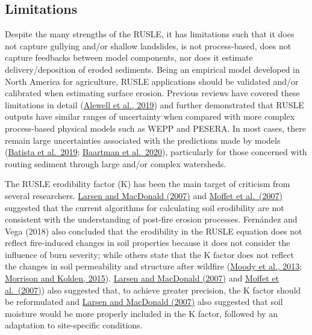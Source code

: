 \documentclass[
]{article}
\begin{document}
\hypertarget{limitations}{%
\subsection*{Limitations}\label{limitations}}

Despite the many strengths of the RUSLE, it has limitations such that it does not capture gullying and/or shallow landslides, is not process-based, does not capture feedbacks between model components, nor does it estimate delivery/deposition of eroded sediments. Being an empirical model developed in North America for agriculture, RUSLE applications should be validated and/or calibrated when estimating surface erosion. Previous reviews have covered these limitations in detail (\href{https://www.sciencedirect.com/science/article/pii/S2095633919300048}{Alewell et al., 2019}) and further demonstrated that RUSLE outputs have similar ranges of uncertainty when compared with more complex process-based physical models such as WEPP and PESERA. In most cases, there remain large uncertainties associated with the predictions made by models (\href{https://www.researchgate.net/publication/334496630_On_the_evaluation_of_soil_erosion_models_Are_we_doing_enough}{Batista et al.~2019}; \href{https://www.sciencedirect.com/science/article/pii/S0169555X20302725}{Baartman et al.~2020}), particularly for those concerned with routing sediment through large and/or complex watersheds.

The RUSLE erodibility factor (K) has been the main target of criticism from several researchers. \href{https://acsess.onlinelibrary.wiley.com/doi/abs/10.2136/sssaj2007.0432}{Larsen and MacDonald (2007)} and \href{https://www.researchgate.net/publication/222540666_Modeling_soil_erosion_on_steep_sagebrush_rangeland_before_and_after_prescribed_fire}{Moffet et al.~(2007)} suggested that the current algorithms for calculating soil erodibility are not consistent with the understanding of post-fire erosion processes. Fernández and Vega (2018) also concluded that the erodibility in the RUSLE equation does not reflect fire-induced changes in soil properties because it does not consider the influence of burn severity; while others state that the K factor does not reflect the changes in soil permeability and structure after wildfire (\href{https://onlinelibrary.wiley.com/doi/10.1002/hyp.13543}{Moody et al., 2013}; \href{https://www.researchgate.net/publication/270163637_Modeling_the_impacts_of_wildfire_on_runoff_and_pollutant_transport_from_coastal_watersheds_to_the_nearshore_environment}{Morrison and Kolden, 2015}). \href{https://acsess.onlinelibrary.wiley.com/doi/abs/10.2136/sssaj2007.0432}{Larsen and MacDonald (2007)} and \href{https://www.researchgate.net/publication/222540666_Modeling_soil_erosion_on_steep_sagebrush_rangeland_before_and_after_prescribed_fire}{Moffet et al.~(2007)}) also suggested that, to achieve greater precision, the K factor should be reformulated and \href{https://acsess.onlinelibrary.wiley.com/doi/abs/10.2136/sssaj2007.0432}{Larsen and MacDonald (2007)} also suggested that soil moisture would be more properly included in the K factor, followed by an adaptation to site-specific conditions.
\end{document}
